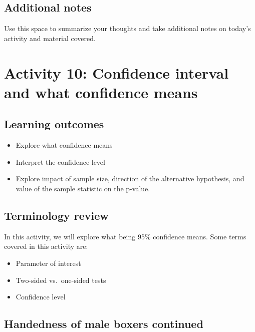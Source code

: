 \documentclass[
]{report}
\begin{document}
\subsection{Additional notes}\label{additional-notes-8}

Use this space to summarize your thoughts and take additional notes on today's activity and material covered.

\newpage

\section{Activity 10: Confidence interval and what confidence means}\label{activity-10-confidence-interval-and-what-confidence-means}


\subsection{Learning outcomes}\label{learning-outcomes-9}

\begin{itemize}
\item
  Explore what confidence means
\item
  Interpret the confidence level
\item
  Explore impact of sample size, direction of the alternative hypothesis, and value of the sample statistic on the p-value.
\end{itemize}

\subsection{Terminology review}\label{terminology-review-8}

In this activity, we will explore what being 95\% confidence means. Some terms covered in this activity are:

\begin{itemize}
\item
  Parameter of interest
\item
  Two-sided vs.~one-sided tests
\item
  Confidence level
\end{itemize}

\subsection{Handedness of male boxers continued}\label{handedness-of-male-boxers-continued}
\end{document}
